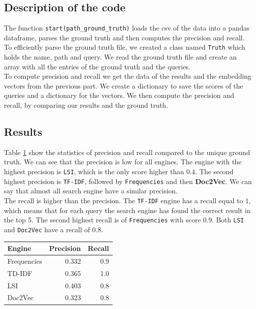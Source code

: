 \documentclass [14 pt]{article}
\begin{document}
\subsection{Description of the code} %
The function \texttt{start(path\_ground\_truth)} loads the csv of the data  into a pandas dataframe, parses the ground truth and then computes the precision and recall.\\
To efficiently parse the ground truth file, we created a class named \texttt{Truth} which holds the name, path and query. We read the ground truth file and create an array with all the entries of the ground truth and the queries.\\
To compute precision and recall we get the data of the results and the embedding vectors from the previous part. We create a dictionary to save the scores of the queries and a dictionary for the vectors. We then compute the precision and recall, by comparing our results and the ground truth.

\subsection{Results} %
Table \ref{tab:Evaluation} show the statistics of precision and recall compared to the unique ground truth.
We can see that the precision is low for all engines. The engine with the highest precision is \texttt{LSI}, which is the only score higher than $0.4$. The second highest precision is \texttt{TF-IDF}, followed by \texttt{Frequencies} and then \textbf{Doc2Vec}.
 We can say that almost all search engine have a similar precision.\\
The recall is higher than the precision. The \texttt{TF-IDF} engine has a recall equal to $1$, which means that for each query the search engine has found the correct result in the top 5. The second highest recall is of \texttt{Frequencies} with score $0.9$. Both \texttt{LSI} and \texttt{Doc2Vec} have a recall of $0.8$.

\begin{table}[h]
\centering
\begin{tabular}{| l r r |}
\hline
\textbf{Engine}	&  \textbf{Precision}	&  \textbf{Recall}	\\ \hline\hline
Frequencies 		&	0.332	&	0.9	\\
TD-IDF			&	0.365	&	1.0	\\
LSI				&	0.403	&	0.8	\\
Doc2Vec			&	0.323	&	0.8	\\ \hline
\end{tabular}
\label{tab:Evaluation}
\end{table}
\end{document}
